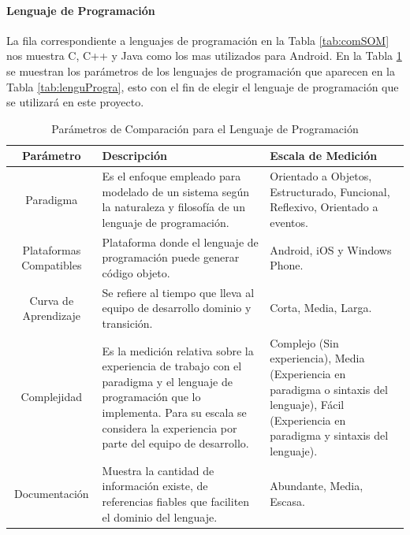 \paragraph{Lenguaje de Programación}

La fila correspondiente a lenguajes de programación en la Tabla \ref{tab:comSOM} nos muestra C, C++ y Java como los mas utilizados para Android. En la Tabla \ref{tab:paramLengu} se muestran los parámetros de los lenguajes de programación que aparecen en la Tabla \ref{tab:lenguProgra}, esto con el fin de elegir el lenguaje de programación que se utilizará en este proyecto. 

\begin{table} 
	\begin{center}
		\begin{tabular}{|c|p{4.5cm}|p{4.5cm}|}
			\hline \rowcolor[RGB]{0,102,204} 
			\textcolor{blanco}{\bf Parámetro} &
				\textcolor{blanco}{\bf Descripción} &
				\textcolor{blanco}{\bf Escala de Medición} \\
			\hline \rowcolor[RGB]{224,224,224} 
				Paradigma &
				Es el enfoque empleado para modelado de un sistema según la naturaleza y filosofía de un lenguaje de programación. &
				Orientado a Objetos, Estructurado, Funcional, Reflexivo, Orientado a eventos. \\
      		\hline 
      			Plataformas Compatibles &
				Plataforma donde el lenguaje de programación puede generar código objeto. &
				Android, iOS y Windows Phone. \\
      		\hline \rowcolor[RGB]{224,224,224} 
      			Curva de Aprendizaje &
				Se refiere al tiempo que lleva al equipo de desarrollo dominio y transición. &
				Corta, Media, Larga. \\
      		\hline 
      			Complejidad &
				Es la medición relativa sobre la experiencia de trabajo con el paradigma y el lenguaje de programación que lo implementa. Para su escala se considera la experiencia por parte del equipo de desarrollo. &
				Complejo (Sin experiencia), Media (Experiencia en paradigma o sintaxis del lenguaje), Fácil (Experiencia en paradigma y sintaxis del lenguaje). \\
      		\hline \rowcolor[RGB]{224,224,224} 
      			Documentación &
				Muestra la cantidad de información existe, de referencias fiables que faciliten el dominio del lenguaje. &
				Abundante, Media, Escasa. \\
      		\hline 
    		\end{tabular}
	\end{center}
	\caption[Parámetros de Comparación para el Lenguaje de Programación]{Parámetros de Comparación para el Lenguaje de Programación} 
	\label{tab:paramLengu}
\end{table}

